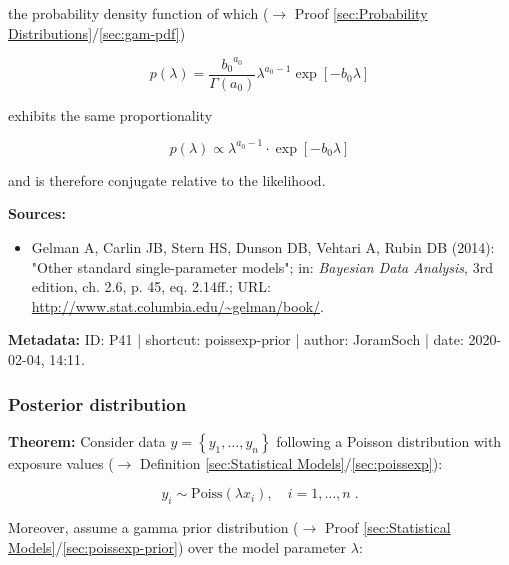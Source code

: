 \documentclass[a4paper,12pt,twoside]{book}
\begin{document}
the probability density function of which ($\rightarrow$ Proof \ref{sec:Probability Distributions}/\ref{sec:gam-pdf})

\begin{equation} \label{eq:poissexp-prior-Poiss-exp-prior-s2}
p(\lambda) = \frac{ {b_0}^{a_0}}{\Gamma(a_0)} \lambda^{a_0-1} \exp[-b_0 \lambda]
\end{equation}

exhibits the same proportionality

\begin{equation} \label{eq:poissexp-prior-Poiss-exp-prior-s3}
p(\lambda) \propto \lambda^{a_0-1} \cdot \exp[-b_0 \lambda]
\end{equation}

and is therefore conjugate relative to the likelihood.


\vspace{1em}
\textbf{Sources:}
\begin{itemize}
\item Gelman A, Carlin JB, Stern HS, Dunson DB, Vehtari A, Rubin DB (2014): "Other standard single-parameter models"; in: \textit{Bayesian Data Analysis}, 3rd edition, ch. 2.6, p. 45, eq. 2.14ff.; URL: \url{http://www.stat.columbia.edu/~gelman/book/}.
\end{itemize}


\vspace{1em}
\textbf{Metadata:} ID: P41 | shortcut: poissexp-prior | author: JoramSoch | date: 2020-02-04, 14:11.
\vspace{1em}



\subsubsection[\textbf{Posterior distribution}]{Posterior distribution} \label{sec:poissexp-post}
\setcounter{equation}{0}

\textbf{Theorem:} Consider data $y = \left\lbrace y_1, \ldots, y_n \right\rbrace$ following a Poisson distribution with exposure values ($\rightarrow$ Definition \ref{sec:Statistical Models}/\ref{sec:poissexp}):

\begin{equation} \label{eq:poissexp-post-Poiss-exp}
y_i \sim \mathrm{Poiss}(\lambda x_i), \quad i = 1, \ldots, n \; .
\end{equation}

Moreover, assume a gamma prior distribution ($\rightarrow$ Proof \ref{sec:Statistical Models}/\ref{sec:poissexp-prior}) over the model parameter $\lambda$:
\end{document}
